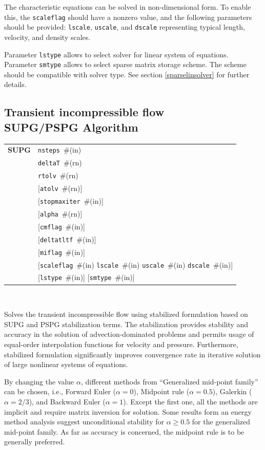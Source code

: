 \documentclass[a4paper]{article}
\makeatletter
\newcommand{\param}[1]{\texttt{#1}} %
\newcommand{\optional}[1]{[#1]} %
\newcommand{\field}[2]{\param{#1}~\#{\tiny(#2)}} %
\newcommand{\optField}[2]{\optional{\field{#1}{#2}}}
\newcommand{\entKeywordInst}[1]{\textbf{#1}} %
\newenvironment{record}[1][]{\begin{tabular}{|ll}}{\end{tabular}\\}
\newcommand{\recentry}[2]{{#1}&{#2}\\}
\newcounter{rcc}
\newenvironment{record}[1][\textwidth]{\setcounter{rcc}{0}\begin{tabular*}{#1}{|ll@{\extracolsep{\fill}}r}}{\end{tabular*}\\}
\newcommand{\recentry}[2]{\ifthenelse{\value{rcc}>0}{&$\backslash$ \\}{\setcounter{rcc}{1}}{#1}&{#2}}
\makeatother
\begin{document}
The characteristic equations can be solved in non-dimensional form. To
enable this, the \param{scaleflag} should have a nonzero value,
and the following parameters should be provided: \param{lscale},
\param{uscale}, and \param{dscale} representing typical length,
velocity, and density scales.

Parameter \param{lstype} allows to select solver for linear system of
equations. Parameter \param{smtype} allows to select sparse matrix storage
scheme. The scheme should be compatible with solver type. See section
\ref{sparselinsolver} for further details.

\subsection{Transient incompressible flow\\SUPG/PSPG Algorithm}
\label{supgIncomp}
\begin{record}
  \recentry{\entKeywordInst{SUPG}}{\field{nsteps}{in}}
  \recentry{}{\field{deltaT}{rn}}
  \recentry{}{\field{rtolv}{rn}}
  \recentry{}{\optField{atolv}{rn}}
  \recentry{}{\optField{stopmaxiter}{in}}
  \recentry{}{\optField{alpha}{rn}}
  \recentry{}{\optField{cmflag}{in}}
  \recentry{}{\optField{deltatltf}{in}}
  \recentry{}{\optField{miflag}{in}}
  \recentry{}{\optional{\field{scaleflag}{in} \field{lscale}{in} \field{uscale}{in} \field{dscale}{in}}}
  \recentry{}{\optField{lstype}{in} \optField{smtype}{in}}
\end{record}

Solves the transient incompressible flow using stabilized formulation
based on SUPG and PSPG
stabilization terms. The stabilization provides
stability and accuracy in the solution of
advection-dominated problems and permits usage of equal-order
interpolation functions for velocity and pressure. Furthermore,
stabilized formulation significantly improves convergence rate in
iterative solution of large nonlinear systems of equations.

By changing the value $\alpha$, different methods from
``Generalized mid-point family'' can be chosen, i.e.,
Forward Euler ($\alpha=0$), Midpoint rule ($\alpha=0.5$),
 Galerkin ($\alpha=2/3$), and  Backward Euler ($\alpha=1$). Except
the first one, all the methods are implicit and require matrix inversion for solution.
Some results form an energy method analysis suggest unconditional
stability for $\alpha\ge 0.5$ for the generalized mid-point family. As
far as accuracy is concerned, the midpoint rule is to be generally preferred.
\end{document}
